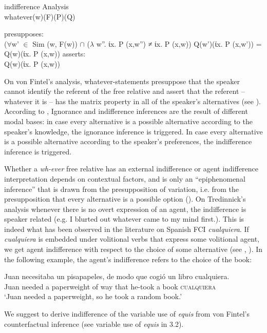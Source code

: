 \documentclass[output=paper
,modfonts
,nonflat]{langsci/langscibook}
\begin{document}
\ea indifference Analysis \citep{Fintel2000}\\
whatever(w)(F)(P)(Q)
\begin{xlist}
\ex presupposes:\\
{($\forall$w’ $\in$ Sim (w, F(w)) $\cap$ ($\lambda$ w”. ίx. P (x,w”) ≠ ίx. P (x,w))
	Q(w’)(ίx. P (x,w’)) = Q(w)(ίx. P (x,w))}
\ex	asserts:\\
{Q(w)(ίx. P (x,w))}
\end{xlist}
\z

On von Fintel’s analysis, whatever-statements presuppose that the speaker cannot identify the referent of the free relative and assert that the referent -- whatever it is -- has the matrix property in all of the speaker's alternatives (see \citealt{Condoravdi2005}). According to \cite{Fintel2000}, Ignorance and indifference inferences are the result of different modal bases: in case every alternative is a possible alternative according to the speaker’s knowledge, the ignorance inference is triggered. In case every alternative is a possible alternative according to the speaker's preferences, the indifference inference is triggered.

Whether a \textit{wh-ever} free relative has an external indifference or agent indifference interpretation depends on contextual factors, and is only an “epiphenomenal inference” that is drawn from the presupposition of variation, i.e. from the presupposition that every alternative is a possible option (\citealt[108]{Tredinnick2005}). On Tredinnick’s analysis whenever there is no overt expression of an agent, the indifference is speaker related (e.g. I blurted out whatever came to my mind first.). This is indeed what has been observed in the literature on Spanish FCI \textit{cualquiera}. If \textit{cualquiera} is embedded under volitional verbs that express some volitional agent, we get agent indifference with respect to the choice of some alternative (see \citealt{CR2008}, \citealt{AM2011}). In the following example, the agent’s indifference refers to the choice of the book:

\ea
\gll Juan necesitaba un pisapapeles, de modo que cogió un libro cualquiera.\\
Juan needed a paperweight of way that he-took a book \textsc{cualquiera}\\
\glt ‘Juan needed a paperweight, so he took a random book.’
\z

We suggest to derive indifference of the variable use of \textit{equis} from von Fintel's counterfactual inference (see variable use of \textit{equis} in 3.2).
\end{document}
